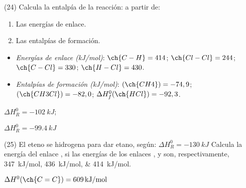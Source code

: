 \documentclass[10pt]{article}
\newenvironment{gexdatos}{
    \noindent\makebox[0pt][r]{\textit{Datos:}}
}{\vspace{5pt}}
\begin{document}
\begin{multicols}{2}
\begin{exercise}
  (24) Calcula la entalpía de la reacción:
   a partir de:
  \begin{enumerate}
    \item Las energías de enlace.
    \item Las entalpías de formación.
  \end{enumerate}

  \begin{gexdatos}
    \begin{itemize}
      \item \textit{Energías de enlace (\si{kJ/mol})}:
      \( \ch{C-H} = 414 \); \( \ch{Cl-Cl} = 244 \); \( \ch{C-Cl} = 330 \); \( \ch{H-Cl} = 430 \).
      \item \textit{Entalpías de formación (\si{kJ/mol})}:
      \( (\ch{CH4}) = -74,9 \); \( (\ch{CH3Cl}) = -82,0 \); \( \Delta H^0_f (\ch{HCl}) = -92,3 \).
    \end{itemize}
  \end{gexdatos}

\end{exercise}

\begin{solution}
  \begin{enumerate*}
    \item \( \Delta H^0_R = \SI{-102}{kJ} \); \item \( \Delta H^0_R = \SI{-99.4}{kJ} \)
  \end{enumerate*}
\end{solution}

\begin{exercise}
  (25) El eteno se hidrogena para dar etano, según:
   \( \Delta H^0_R = \SI{-130}{kJ} \)
  Calcula la energía del enlace , si las energías de los
  enlaces ,  y  son, respectivamente, \SIlist{347;436;414}{kJ/mol}.
\end{exercise}

\begin{solution}
  \( \Delta H^0 (\ch{C=C}) = \SI{609}{kJ/mol} \)
\end{solution}



\end{multicols}
\end{document}
